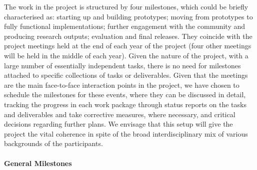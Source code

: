 
The work in the \TheProject project is structured by four milestones, which could be
briefly characterised as: starting up and building prototypes; moving from prototypes to
fully functional implementations; further engagement with the community and producing
research outputs; evaluation and final releases. They coincide with the project meetings
held at the end of each year of the project (four other meetings will be held in the
middle of each year).  Given the nature of the project, with a large number of essentially
independent tasks, there is no need for milestones attached to specific collections of
tasks or deliverables.  Given that the meetings are the main face-to-face interaction
points in the project, we have chosen to schedule the milestones for these events, where
they can be discussed in detail, tracking the progress in each work package through status
reports on the tasks and deliverables and take corrective measures, where necessary, and
critical decisions regarding further plans.  We envisage that this setup will give the
project the vital coherence in spite of the broad interdisciplinary mix of various
backgrounds of the participants.

\paragraph{General Milestones}

